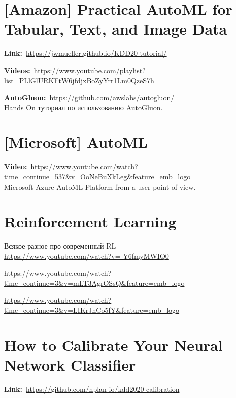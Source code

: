 
\section{[Amazon] Practical AutoML for Tabular, Text, and Image Data}

\textbf{Link:}~\url{https://jwmueller.github.io/KDD20-tutorial/} 

\textbf{Videos:}~\url{https://www.youtube.com/playlist?list=PLlGlURKFtW6jfdjxBoZyYrr1Lm0QzeS7h}

\textbf{AutoGluon:}~\url{https://github.com/awslabs/autogluon/} \\

Hands On туториал по использованию AutoGluon.


\section{[Microsoft] AutoML}
\textbf{Video:}~\url{https://www.youtube.com/watch?time_continue=537&v=OoNeBuXkLeg&feature=emb_logo} \\

Microsoft Azure AutoML Platform from a user point of view.


\section{Reinforcement Learning}

Всякое разное про современный RL \\

\url{https://www.youtube.com/watch?v=-Y6fmyMWIQ0}

\url{https://www.youtube.com/watch?time_continue=3&v=mLT3AgrOSsQ&feature=emb_logo}

\url{https://www.youtube.com/watch?time_continue=3&v=LIKrJnCo5fY&feature=emb_logo}


\section{How to Calibrate Your Neural Network Classifier}

\textbf{Link:}~\url{https://github.com/nplan-io/kdd2020-calibration}

